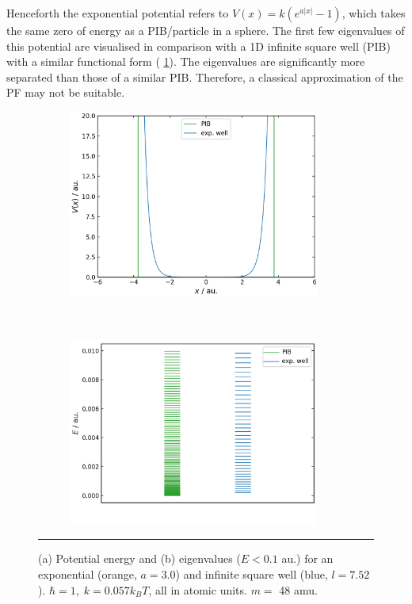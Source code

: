 \documentclass[../main.tex]{subfiles}
\begin{document}
Henceforth the exponential potential refers to $V(x) = k(e^{a|x|} - 1)$, which takes the same zero of energy as a PIB/particle in a sphere. The first few eigenvalues of this potential are visualised in comparison with a 1D infinite square well (PIB) with a similar functional form (\figurename{ \ref{1d_exp_well_pib_potential_eigenvalues}}). The eigenvalues are significantly more separated than those of a similar PIB. Therefore, a classical approximation of the PF may not be suitable.

\begin{figure}[h!]

	\begin{subfigure}[t]{0.49\textwidth}
		\centering
		\includegraphics[height=6.2cm]{4/figs/1d_exp_well_pib_potential}
		\caption{}
	\end{subfigure}%
	~ 
	\begin{subfigure}[t]{0.49\textwidth}
		\centering
		\includegraphics[height=6.2cm]{4/figs/1d_exp_well_pib_eigenvalues}
		\caption{}
	\end{subfigure}
	\vspace{0.2cm}
	\hrule
	\caption{(a) Potential energy and (b) eigenvalues ($E < 0.1$ au.) for an exponential (orange, $a = 3.0$) and infinite square well (blue, $ l = 7.52$). $\hbar = 1,\; k = 0.057 k_B T$, all in atomic units. $m =$ 48 amu.} 
	\label{1d_exp_well_pib_potential_eigenvalues}
\end{figure}
\end{document}
